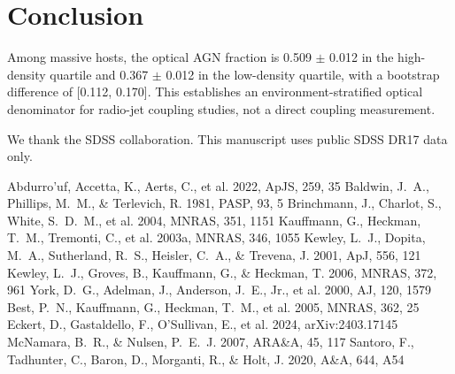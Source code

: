 \documentclass[twocolumn]{aastex631}
\begin{document}
\section{Conclusion}\label{sec:conclusion}
Among massive hosts, the optical AGN fraction is 0.509 $\pm$ 0.012 in the high-density quartile and 0.367 $\pm$ 0.012 in the low-density quartile, with a bootstrap difference of [0.112, 0.170]. This establishes an environment-stratified optical denominator for radio-jet coupling studies, not a direct coupling measurement.

\acknowledgments
We thank the SDSS collaboration. This manuscript uses public SDSS DR17 data only.


\begin{thebibliography}{}
 Abdurro'uf, Accetta, K., Aerts, C., et al. 2022, ApJS, 259, 35
 Baldwin, J.~A., Phillips, M.~M., \& Terlevich, R. 1981, PASP, 93, 5
 Brinchmann, J., Charlot, S., White, S.~D.~M., et al. 2004, MNRAS, 351, 1151
 Kauffmann, G., Heckman, T.~M., Tremonti, C., et al. 2003a, MNRAS, 346, 1055
 Kewley, L.~J., Dopita, M.~A., Sutherland, R.~S., Heisler, C.~A., \& Trevena, J. 2001, ApJ, 556, 121
 Kewley, L.~J., Groves, B., Kauffmann, G., \& Heckman, T. 2006, MNRAS, 372, 961
 York, D.~G., Adelman, J., Anderson, J.~E., Jr., et al. 2000, AJ, 120, 1579
 Best, P.~N., Kauffmann, G., Heckman, T.~M., et al. 2005, MNRAS, 362, 25
 Eckert, D., Gastaldello, F., O'Sullivan, E., et al. 2024, arXiv:2403.17145
 McNamara, B.~R., \& Nulsen, P.~E.~J. 2007, ARA\&A, 45, 117
 Santoro, F., Tadhunter, C., Baron, D., Morganti, R., \& Holt, J. 2020, A\&A, 644, A54
\end{thebibliography}
\end{document}
